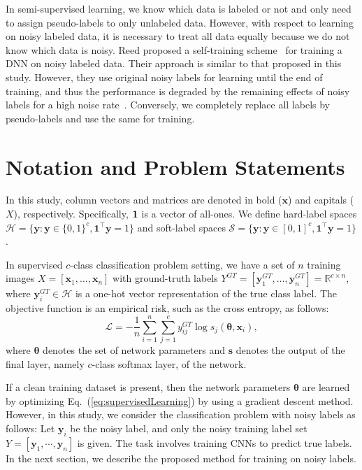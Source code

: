 \documentclass[10pt,twocolumn,letterpaper]{article}
\newcommand{\bvec}[1]{{\mbox{\boldmath $#1$}}}
\newcommand{\Eref}[1]{Eq.~(\ref{#1})}
\begin{document}
In semi-supervised learning, we know which data is labeled or not and only need to assign pseudo-labels to only unlabeled data. However, with respect to learning on noisy labeled data, it is necessary to treat all data equally because we do not know which data is noisy. Reed \etal proposed a self-training scheme~\cite{reed2014training} for training a DNN on noisy labeled data. Their approach is similar to that proposed in this study. However, they use original noisy labels for learning until the end of training, and thus the performance is degraded by the remaining effects of noisy labels for a high noise rate~\cite{reed2014training,jindal2016learning}. Conversely, we completely replace all labels by pseudo-labels and use the same for training.

\section{Notation and Problem Statements}
In this study, column vectors and matrices are denoted in bold (\eg $\bm{x}$) and capitals (\eg $X$), respectively. Specifically, $\bvec{1}$ is a vector of all-ones.
We define hard-label spaces $\mathcal{H}=\{\bm{y}:\bm{y}\in\{0,1\}^c, \bm{1}^\top\bm{y}=1\}$ and soft-label spaces $\mathcal{S}=\{\bm{y}:\bm{y}\in[0,1]^c, \bm{1}^\top\bm{y}=1\}$.

In supervised $c$-class classification problem setting, we have a set of $n$ training images $X=[\bm{x}_1,\dots,\bm{x}_n]$
with ground-truth labels $Y^{GT}=[\bm{y}^{GT}_1,\dots,\bm{y}^{GT}_n]=\mathbb{R}^{c\times n}$,
where $\bm{y}^{GT}_i\in\mathcal{H}$ is a one-hot vector representation of the true class label. The objective function is an empirical risk, such as the cross entropy, as follows:
\begin{equation}
\mathcal{L}=-\frac{1}{n}\sum_{i=1}^n\sum_{j=1}^cy^{GT}_{ij}\log s_j(\bm{\theta},\bm{x}_i),
\label{eq:supervisedLearning}
\end{equation}
where $\bm{\theta}$ denotes the set of network parameters and $\bm{s}$ denotes the output of the final layer, namely $c$-class softmax layer, of the network.

If a clean training dataset is present, then the network parameters $\bm{\theta}$ are learned by optimizing \Eref{eq:supervisedLearning} by using a gradient descent method. However, in this study, we consider the classification problem with noisy labels as follows: Let $\bm{y}_i$ be the noisy label, and only the noisy training label set $Y=[\bm{y}_1,\cdots,\bm{y}_n]$ is given. The task involves training CNNs to predict true labels. In the next section, we describe the proposed method for training on noisy labels.
\end{document}
